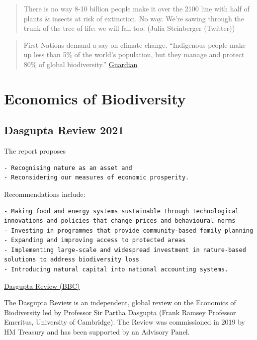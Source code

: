 \documentclass[
]{book}
\begin{document}
\begin{quote}
There is no way 8-10 billion people make it over the 2100 line with
half of plants \& insects at risk of extinction.
No way.
We're sawing through the trunk of the tree of life:
we will fall too.
(Julia Steinberger (Twitter))
\end{quote}

\begin{quote}
First Nations demand a say on climate change.
``Indigenous people make up less than 5\% of the world's population, but they manage and protect 80\% of global biodiversity.''
\href{https://www.theguardian.com/australia-news/2021/mar/27/we-want-to-be-included-first-nations-demand-a-say-on-climate-change}{Guardian}
\end{quote}

\hypertarget{economics-of-biodiversity}{%
\section{Economics of Biodiversity}\label{economics-of-biodiversity}}

\hypertarget{dasgupta-review-2021}{%
\subsection{Dasgupta Review 2021}\label{dasgupta-review-2021}}

The report proposes

\begin{verbatim}
- Recognising nature as an asset and  
- Reconsidering our measures of economic prosperity.
\end{verbatim}

Recommendations include:

\begin{verbatim}
- Making food and energy systems sustainable through technological innovations and policies that change prices and behavioural norms  
- Investing in programmes that provide community-based family planning  
- Expanding and improving access to protected areas  
- Implementing large-scale and widespread investment in nature-based solutions to address biodiversity loss  
- Introducing natural capital into national accounting systems.
\end{verbatim}

\href{https://www.bbc.com/news/science-environment-55893696}{Dasgupta Review (BBC)}

The Dasgupta Review is an independent, global review on the Economics of Biodiversity led by Professor Sir Partha Dasgupta (Frank Ramsey Professor Emeritus, University of Cambridge). The Review was commissioned in 2019 by HM Treasury and has been supported by an Advisory Panel.
\end{document}
